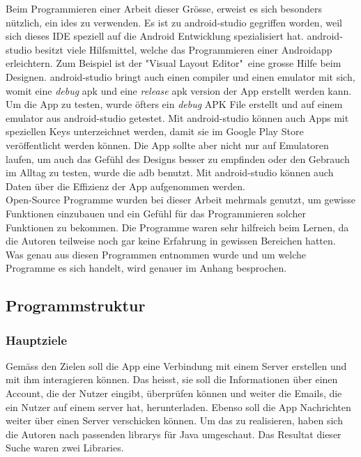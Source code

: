 \documentclass[a4paper,11pt]{article}
\begin{document}
Beim Programmieren einer Arbeit dieser Grösse, erweist es sich besonders nützlich, ein \glspl{ide} zu verwenden. Es ist zu \gls{android-studio} gegriffen worden, weil sich dieses 
IDE speziell auf die Android Entwicklung spezialisiert hat. \gls{android-studio} besitzt viele Hilfsmittel, welche das Programmieren einer Androidapp erleichtern. Zum Beispiel ist der
"Visual Layout Editor"\ eine grosse Hilfe beim Designen. \gls{android-studio} bringt auch einen \gls{compiler} und einen \gls{emulator} mit sich, womit eine \textit{debug} \gls{apk} und eine
\textit{release} \gls{apk} version der App erstellt werden kann. Um die App zu testen, wurde öfters ein \textit{debug} APK File erstellt und auf einem \gls{emulator} aus \gls{android-studio}
getestet. Mit \gls{android-studio} können auch Apps mit speziellen Keys unterzeichnet werden, damit sie im Google Play Store veröffentlicht werden können.
Die App sollte aber nicht nur auf Emulatoren laufen, um auch das Gefühl des Designs besser zu empfinden oder den Gebrauch im Alltag zu testen, wurde die \gls{adb} benutzt.
Mit \gls{android-studio} können auch Daten über die Effizienz der App aufgenommen werden. 
\cite{android-studio} \\

Open-Source Programme wurden bei dieser Arbeit mehrmals genutzt, um gewisse Funktionen einzubauen und ein Gefühl für das Programmieren solcher Funktionen zu bekommen. Die Programme
waren sehr 
hilfreich beim Lernen, da die Autoren teilweise noch gar keine Erfahrung in gewissen Bereichen hatten. Was genau aus diesen Programmen entnommen wurde und um welche Programme es sich handelt, wird 
genauer im Anhang besprochen. 



\subsection{Programmstruktur}

\subsubsection{Hauptziele}
Gemäss den Zielen soll die App eine Verbindung mit einem Server erstellen und mit ihm interagieren können. Das heisst, sie soll die Informationen über einen Account, die der 
Nutzer eingibt, überprüfen können und weiter die Emails, die ein Nutzer auf einem \gls{server} hat, herunterladen. Ebenso soll die App Nachrichten weiter über einen Server verschicken können. 
Um das zu realisieren, haben sich die Autoren nach passenden \glspl{library} für Java umgeschaut. Das Resultat dieser Suche waren zwei Libraries. \\
\end{document}
